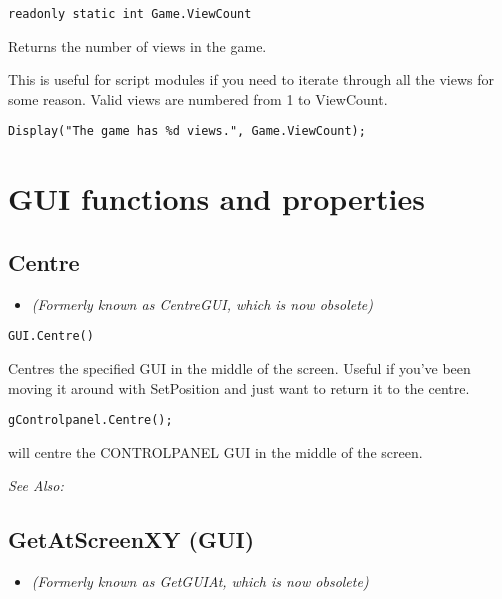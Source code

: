 \begin{verbatim}
readonly static int Game.ViewCount
\end{verbatim}
Returns the number of views in the game.

This is useful for script modules if you need to iterate through all the views for some reason.
Valid views are numbered from 1 to ViewCount.

\begin{verbatim}
Display("The game has %d views.", Game.ViewCount);
\end{verbatim}



\section{GUI functions and properties}\label{GUIFuncsAndProps}%



\subsection{Centre}\label{GUI.Centre}%

\begin{itemize}
\item \it{(Formerly known as CentreGUI, which is now obsolete)}
\end{itemize}

\begin{verbatim}
GUI.Centre()
\end{verbatim}
Centres the specified GUI in the middle of the screen. Useful if you've been moving
it around with SetPosition and just want to return it to the centre.

\begin{verbatim}
gControlpanel.Centre();
\end{verbatim}
will centre the CONTROLPANEL GUI in the middle of the screen.

\it{See Also:} 


\subsection{GetAtScreenXY (GUI)}\label{GUI.GetAtScreenXY}%

\begin{itemize}
\item \it{(Formerly known as GetGUIAt, which is now obsolete)}
\end{itemize}

